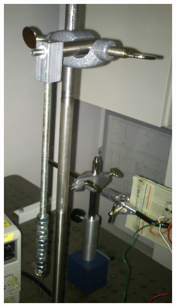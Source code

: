 \begin{figure}[htbp]
\begin{subfigure}{.3\textwidth}
	\includegraphics[width=\textwidth]{img/pendulumHeavy}
	\caption{}
	\label{fig:pendulumHeavy}
\end{subfigure}
\begin{subfigure}{.3\textwidth}
	\centering

\end{subfigure}
\end{figure}
